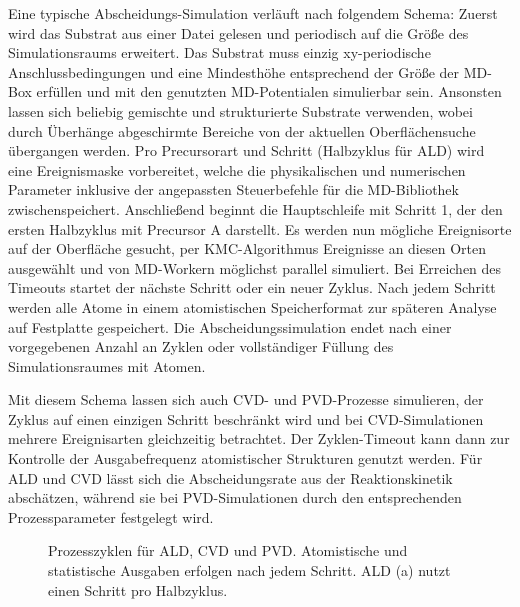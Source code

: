 Eine typische Abscheidungs-Simulation verläuft nach folgendem Schema:
Zuerst wird das Substrat aus einer Datei gelesen und periodisch auf die Größe des Simulationsraums erweitert.
Das Substrat muss einzig xy-periodische Anschlussbedingungen und eine Mindesthöhe entsprechend der Größe der MD-Box erfüllen und mit den genutzten MD-Potentialen simulierbar sein.
Ansonsten lassen sich beliebig gemischte und strukturierte Substrate verwenden, wobei durch Überhänge abgeschirmte Bereiche von der aktuellen Oberflächensuche übergangen werden.
Pro Precursorart und Schritt (Halbzyklus für ALD) wird eine Ereignismaske vorbereitet, welche die physikalischen und numerischen Parameter inklusive der angepassten Steuerbefehle für die MD-Bibliothek zwischenspeichert.
Anschließend beginnt die Hauptschleife mit Schritt 1, der den ersten Halbzyklus mit Precursor A darstellt.
Es werden nun mögliche Ereignisorte auf der Oberfläche gesucht, per KMC-Algorithmus Ereignisse an diesen Orten ausgewählt und von MD-Workern möglichst parallel simuliert.
Bei Erreichen des Timeouts startet der nächste Schritt oder ein neuer Zyklus.
Nach jedem Schritt werden alle Atome in einem atomistischen Speicherformat zur späteren Analyse auf Festplatte gespeichert.
Die Abscheidungssimulation endet nach einer vorgegebenen Anzahl an Zyklen oder vollständiger Füllung des Simulationsraumes mit Atomen.

Mit diesem Schema lassen sich auch CVD- und PVD-Prozesse simulieren, der Zyklus auf einen einzigen Schritt beschränkt wird und bei CVD-Simulationen mehrere Ereignisarten gleichzeitig betrachtet.
Der Zyklen-Timeout kann dann zur Kontrolle der Ausgabefrequenz atomistischer Strukturen genutzt werden.
Für ALD und CVD lässt sich die Abscheidungsrate aus der Reaktionskinetik abschätzen, während sie bei PVD-Simulationen durch den entsprechenden Prozessparameter festgelegt wird.

\begin{figure}
  \captionsetup[subfigure]{singlelinecheck=false}
  \begin{subfigure}[t]{5.7cm}
    \def\svgwidth{\textwidth}
    
  \end{subfigure}
  \hfill
  \begin{subfigure}[t]{4.7cm}
    \def\svgwidth{\textwidth}
    
  \end{subfigure}
  \hfill
  \begin{subfigure}[t]{3cm}
    \def\svgwidth{\textwidth}
    
  \end{subfigure}
  \caption[Prozesszyklen für ALD, CVD und PVD]{
    Prozesszyklen für ALD, CVD und PVD.
    Atomistische und statistische Ausgaben erfolgen nach jedem Schritt.
    ALD (a) nutzt einen Schritt pro Halbzyklus.
  }
  \label{fig:parsivald-modes}
\end{figure}

